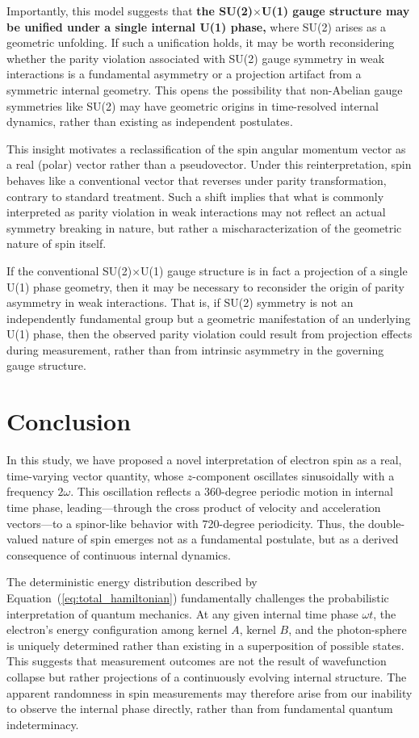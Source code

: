 \documentclass[%
 reprint,
 amsmath,amssymb,
 aps,
]{revtex4-1}
\numberwithin{equation}{section}%
\begin{document}
Importantly, this model suggests that \textbf{the SU(2)$\times$U(1) gauge structure may be unified under a single internal U(1) phase,} where SU(2) arises as a geometric unfolding. If such a unification holds, it may be worth reconsidering whether the parity violation associated with SU(2) gauge symmetry in weak interactions is a fundamental asymmetry or a projection artifact from a symmetric internal geometry. This opens the possibility that non-Abelian gauge symmetries like SU(2) may have geometric origins in time-resolved internal dynamics, rather than existing as independent postulates.

This insight motivates a reclassification of the spin angular momentum vector as a real (polar) vector rather than a pseudovector. Under this reinterpretation, spin behaves like a conventional vector that reverses under parity transformation, contrary to standard treatment. Such a shift implies that what is commonly interpreted as parity violation in weak interactions may not reflect an actual symmetry breaking in nature, but rather a mischaracterization of the geometric nature of spin itself.

If the conventional SU(2)$\times$U(1) gauge structure is in fact a projection of a single U(1) phase geometry, then it may be necessary to reconsider the origin of parity asymmetry in weak interactions. That is, if SU(2) symmetry is not an independently fundamental group but a geometric manifestation of an underlying U(1) phase, then the observed parity violation could result from projection effects during measurement, rather than from intrinsic asymmetry in the governing gauge structure.


\section{Conclusion}
\label{sec:conclusion}

In this study, we have proposed a novel interpretation of electron spin as a real, time-varying vector quantity, whose $z$-component oscillates sinusoidally with a frequency $2\omega$. This oscillation reflects a 360-degree periodic motion in internal time phase, leading—through the cross product of velocity and acceleration vectors—to a spinor-like behavior with 720-degree periodicity. Thus, the double-valued nature of spin emerges not as a fundamental postulate, but as a derived consequence of continuous internal dynamics.

The deterministic energy distribution described by Equation~(\ref{eq:total_hamiltonian}) fundamentally challenges the probabilistic interpretation of quantum mechanics. At any given internal time phase $\omega t$, the electron's energy configuration among kernel $A$, kernel $B$, and the photon-sphere is uniquely determined rather than existing in a superposition of possible states. This suggests that measurement outcomes are not the result of wavefunction collapse but rather projections of a continuously evolving internal structure. The apparent randomness in spin measurements may therefore arise from our inability to observe the internal phase directly, rather than from fundamental quantum indeterminacy.
\end{document}
